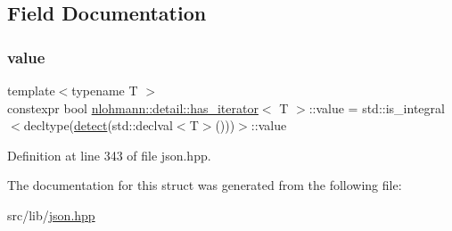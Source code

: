 \subsection{Field Documentation}
\mbox{\label{structnlohmann_1_1detail_1_1has__iterator_a6b2d05c363cea5b3f11891b827a4c923}} 
\subsubsection{\texorpdfstring{value}{value}}
{\footnotesize\ttfamily template$<$typename T $>$ \\
constexpr bool \hyperlink{structnlohmann_1_1detail_1_1has__iterator}{nlohmann\+::detail\+::has\+\_\+iterator}$<$ T $>$\+::value = std\+::is\+\_\+integral$<$decltype(\hyperlink{structnlohmann_1_1detail_1_1has__iterator_a2977f1c63d04faa52d333396bb08e3b5}{detect}(std\+::declval$<$T$>$()))$>$\+::value\hspace{0.3cm}{\ttfamily [static]}}



Definition at line 343 of file json.\+hpp.



The documentation for this struct was generated from the following file\+:\begin{DoxyCompactItemize}
\item 
src/lib/\hyperlink{json_8hpp}{json.\+hpp}\end{DoxyCompactItemize}
